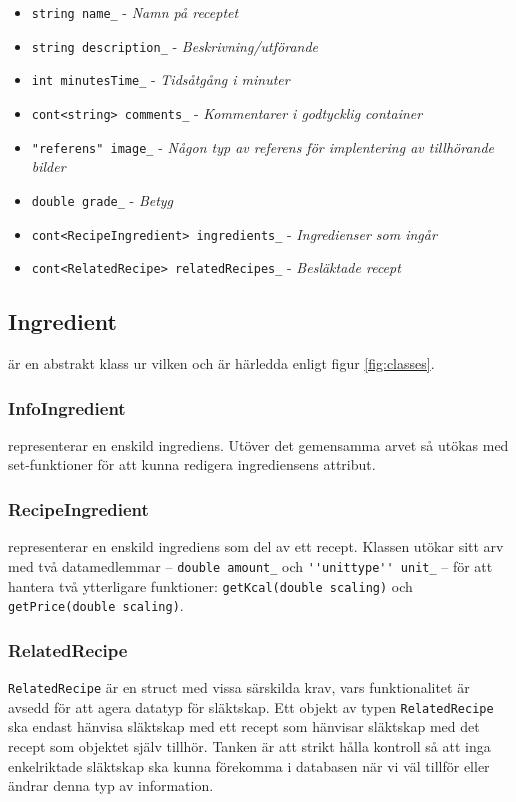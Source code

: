   \begin{itemize}
    \item \verb+string name_+ - \emph{Namn på receptet}
    \item \verb+string description_+ - \emph{Beskrivning/utförande}
    \item \verb+int minutesTime_+ - \emph{Tidsåtgång i minuter}
    \item \verb+cont<string> comments_+ - \emph{Kommentarer i godtycklig container}
    \item \verb+"referens" image_+ - \emph{Någon typ av referens för implentering av tillhörande bilder}
    \item \verb+double grade_+ - \emph{Betyg}
  \end{itemize}

  \begin{itemize}
    \item \verb+cont<RecipeIngredient> ingredients_+ - \emph{Ingredienser som ingår}
    \item \verb+cont<RelatedRecipe> relatedRecipes_+ - \emph{Besläktade recept}
  \end{itemize}


\subsection{Ingredient}
\Ingredient{} är en abstrakt klass ur vilken \InfoIngredient{} och \RecipeIngredient{} är härledda enligt figur \ref{fig:classes}.

\subsubsection{InfoIngredient}
\InfoIngredient representerar en enskild ingrediens. Utöver det gemensamma arvet så utökas \InfoIngredient med set-funktioner för att kunna redigera ingrediensens attribut.

\subsubsection{RecipeIngredient}
\RecipeIngredient{} representerar en enskild ingrediens som del av ett recept. Klassen utökar sitt arv med två datamedlemmar -- \verb=double amount_= och \verb=''unittype'' unit_= -- för att hantera två ytterligare funktioner: \verb+getKcal(double scaling)+ och \verb+getPrice(double scaling)+.
 
\subsubsection{RelatedRecipe}
\verb+RelatedRecipe+ är en struct med vissa särskilda krav, vars funktionalitet är avsedd för att agera datatyp för släktskap. Ett objekt av typen \verb+RelatedRecipe+ ska endast hänvisa släktskap med ett recept som hänvisar släktskap med det recept som objektet själv tillhör. Tanken är att strikt hålla kontroll så att inga enkelriktade släktskap ska kunna förekomma i databasen när vi väl tillför eller ändrar denna typ av information.

